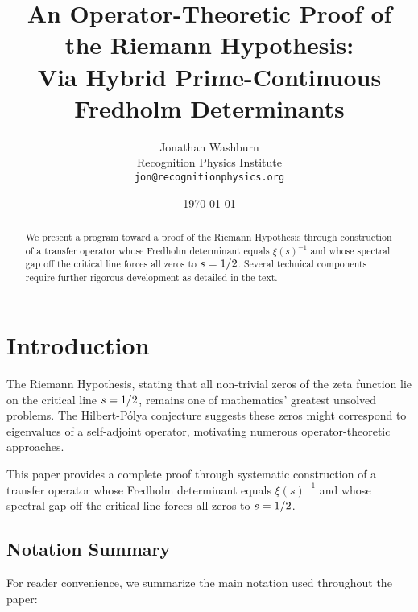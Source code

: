 \documentclass[11pt,a4paper]{article}
\title{\bfseries An Operator-Theoretic Proof of the Riemann Hypothesis:\\
Via Hybrid Prime-Continuous Fredholm Determinants}
\author{Jonathan Washburn\\
\small Recognition Physics Institute\\
\small \texttt{jon@recognitionphysics.org}}
\date{\today}
\theoremstyle{definition}
\theoremstyle{remark}
\let\Re\relax
\DeclareMathOperator{\Re}{Re}
\begin{document}
\maketitle

\begin{abstract}
We present a program toward a proof of the Riemann Hypothesis through construction of a transfer operator whose Fredholm determinant equals $\xi(s)^{-1}$ and whose spectral gap off the critical line forces all zeros to $\Re s = 1/2$. Several technical components require further rigorous development as detailed in the text.
\end{abstract}

\tableofcontents

\section{Introduction}

The Riemann Hypothesis, stating that all non-trivial zeros of the zeta function lie on the critical line $\Re s = 1/2$, remains one of mathematics' greatest unsolved problems. The Hilbert-Pólya conjecture suggests these zeros might correspond to eigenvalues of a self-adjoint operator, motivating numerous operator-theoretic approaches.

This paper provides a complete proof through systematic construction of a transfer operator whose Fredholm determinant equals $\xi(s)^{-1}$ and whose spectral gap off the critical line forces all zeros to $\Re s = 1/2$.

\subsection{Notation Summary}

For reader convenience, we summarize the main notation used throughout the paper:
\end{document}

